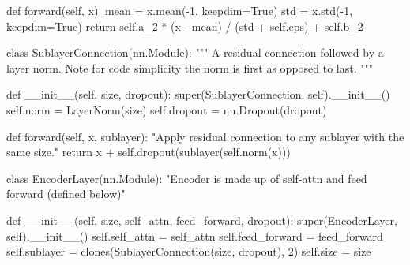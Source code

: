 \documentclass[
  letterpaper,
  DIV=11,
  numbers=noendperiod]{scrreprt}
\newenvironment{Shaded}{\begin{snugshade}}{\end{snugshade}}
\newcommand{\BuiltInTok}[1]{\textcolor[rgb]{0.00,0.23,0.31}{#1}}
\newcommand{\CommentTok}[1]{\textcolor[rgb]{0.37,0.37,0.37}{#1}}
\newcommand{\ControlFlowTok}[1]{\textcolor[rgb]{0.00,0.23,0.31}{#1}}
\newcommand{\DecValTok}[1]{\textcolor[rgb]{0.68,0.00,0.00}{#1}}
\newcommand{\FunctionTok}[1]{\textcolor[rgb]{0.28,0.35,0.67}{#1}}
\newcommand{\KeywordTok}[1]{\textcolor[rgb]{0.00,0.23,0.31}{#1}}
\newcommand{\NormalTok}[1]{\textcolor[rgb]{0.00,0.23,0.31}{#1}}
\newcommand{\OperatorTok}[1]{\textcolor[rgb]{0.37,0.37,0.37}{#1}}
\newcommand{\VariableTok}[1]{\textcolor[rgb]{0.07,0.07,0.07}{#1}}
\begin{document}
\begin{Shaded}
\begin{Highlighting}[]
    \KeywordTok{def}\NormalTok{ forward(}\VariableTok{self}\NormalTok{, x):}
\NormalTok{        mean }\OperatorTok{=}\NormalTok{ x.mean(}\OperatorTok{{-}}\DecValTok{1}\NormalTok{, keepdim}\OperatorTok{=}\VariableTok{True}\NormalTok{)}
\NormalTok{        std }\OperatorTok{=}\NormalTok{ x.std(}\OperatorTok{{-}}\DecValTok{1}\NormalTok{, keepdim}\OperatorTok{=}\VariableTok{True}\NormalTok{)}
        \ControlFlowTok{return} \VariableTok{self}\NormalTok{.a\_2 }\OperatorTok{*}\NormalTok{ (x }\OperatorTok{{-}}\NormalTok{ mean) }\OperatorTok{/}\NormalTok{ (std }\OperatorTok{+} \VariableTok{self}\NormalTok{.eps) }\OperatorTok{+} \VariableTok{self}\NormalTok{.b\_2}
        

\KeywordTok{class}\NormalTok{ SublayerConnection(nn.Module):}
    \CommentTok{"""}
\CommentTok{    A residual connection followed by a layer norm.}
\CommentTok{    Note for code simplicity the norm is first as opposed to last.}
\CommentTok{    """}

    \KeywordTok{def} \FunctionTok{\_\_init\_\_}\NormalTok{(}\VariableTok{self}\NormalTok{, size, dropout):}
        \BuiltInTok{super}\NormalTok{(SublayerConnection, }\VariableTok{self}\NormalTok{).}\FunctionTok{\_\_init\_\_}\NormalTok{()}
        \VariableTok{self}\NormalTok{.norm }\OperatorTok{=}\NormalTok{ LayerNorm(size)}
        \VariableTok{self}\NormalTok{.dropout }\OperatorTok{=}\NormalTok{ nn.Dropout(dropout)}

    \KeywordTok{def}\NormalTok{ forward(}\VariableTok{self}\NormalTok{, x, sublayer):}
        \CommentTok{"Apply residual connection to any sublayer with the same size."}
        \ControlFlowTok{return}\NormalTok{ x }\OperatorTok{+} \VariableTok{self}\NormalTok{.dropout(sublayer(}\VariableTok{self}\NormalTok{.norm(x)))}
        

\KeywordTok{class}\NormalTok{ EncoderLayer(nn.Module):}
    \CommentTok{"Encoder is made up of self{-}attn and feed forward (defined below)"}

    \KeywordTok{def} \FunctionTok{\_\_init\_\_}\NormalTok{(}\VariableTok{self}\NormalTok{, size, self\_attn, feed\_forward, dropout):}
        \BuiltInTok{super}\NormalTok{(EncoderLayer, }\VariableTok{self}\NormalTok{).}\FunctionTok{\_\_init\_\_}\NormalTok{()}
        \VariableTok{self}\NormalTok{.self\_attn }\OperatorTok{=}\NormalTok{ self\_attn}
        \VariableTok{self}\NormalTok{.feed\_forward }\OperatorTok{=}\NormalTok{ feed\_forward}
        \VariableTok{self}\NormalTok{.sublayer }\OperatorTok{=}\NormalTok{ clones(SublayerConnection(size, dropout), }\DecValTok{2}\NormalTok{)}
        \VariableTok{self}\NormalTok{.size }\OperatorTok{=}\NormalTok{ size}


\end{Highlighting}
\end{Shaded}
\end{document}
